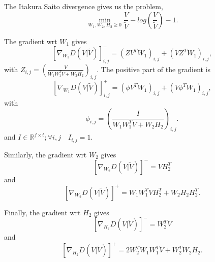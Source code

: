 \documentclass{article}
\begin{document}
The Itakura Saito divergence gives us the problem,
$$\min_{W_1,W_2,H_2 \geq 0} \frac{V}{\tilde{V}} - log(\frac{V}{\tilde{V}}) -1.$$

The gradient wrt $W_1$ gives
$$[\nabla_{W_1} D(V|\tilde{V})]_{i,j}^{-} = (ZV^TW_1)_{i,j} + (VZ^TW_1)_{i,j},$$
with $Z_{i,j} = (\frac{V}{W_1W_1^TV + W_2H_2})_{i,j}$. 
The positive part of the gradient is
$$[\nabla_{W_1} D(V|\tilde{V})]_{i,j}^{+} = (\phi V^TW_1)_{i,j} + (V \phi^T W_1)_{i,j},$$
with $$ \phi_{i,j} = (\frac{I}{W_1W_1^TV + W_2H_2})_{i,j}.$$ and $I \in \mathbb{R}^{f \times t} ; \forall i,j \quad I_{i,j}=1$.


Similarly, the gradient wrt $W_2$ gives
$$ [\nabla_{W_2} D(V|\tilde{V})]^{-} = VH_2^T $$
and
$$ [\nabla_{W_2} D(V|\tilde{V})]^{+} = W_1W_1^TVH_2^T + W_2H_2H_2^T.$$

Finally, the gradient wrt $H_2$ gives
$$ [\nabla_{H_2} D(V|\tilde{V})]^{-} = W_2^TV  $$
and
$$ [\nabla_{H_2} D(V|\tilde{V})]^{+} = 2W_2^TW_1W_1^TV + W_2^TW_2H_2. $$




\end{document}
